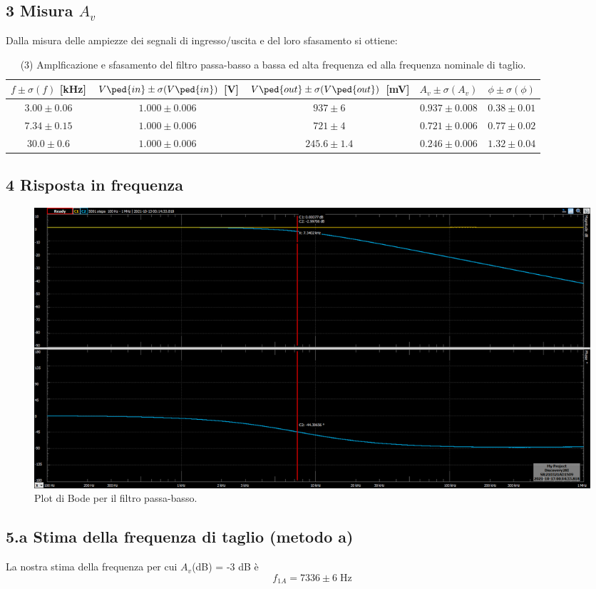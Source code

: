 \documentclass[10pt,a4paper]{article}
\begin{document}
\subsection*{3 Misura $A_v$}
Dalla misura delle ampiezze dei segnali di ingresso/uscita e del loro 
sfasamento si ottiene:
\begin{table}[h]
\centering
\begin{tabular}{|c|c|c|c|c|}
\hline 
$f \pm \sigma(f)$ [kHz] & $V\ped{in} \pm \sigma(V\ped{in})$ [V] 
                        & $V\ped{out} \pm \sigma(V\ped{out})$ [mV] & $A_v \pm 
\sigma(A_v)$
& $\phi \pm \sigma(\phi)$ \\
\hline 
$3.00 \pm 0.06$ & $1.000 \pm 0.006$ & $937 \pm 6$ & $0.937 \pm 0.008$ & $0.38 \pm 
0.01$ \\
$7.34 \pm 0.15$ & $1.000 \pm 0.006$ & $721 \pm 4$ & $0.721 \pm 0.006$ & $0.77 \pm 
0.02$ \\
$30.0 \pm 0.6$ & $1.000 \pm 0.006$ & $245.6 \pm 1.4$ & $0.246 \pm 0.006$ & $1.32 \pm 
0.04$ \\
\hline 
\end{tabular} 
\caption{(3) Amplficazione e sfasamento del filtro passa-basso a bassa ed alta 
frequenza ed alla frequenza nominale di taglio.
\label{tab: lpfmes}}
\end{table}

\subsection*{4 Risposta in frequenza}
\begin{figure}[htbp]
\centering
\includegraphics[scale=0.35]{rc2k10nF_new}
\caption{Plot di Bode per il filtro passa-basso.}
\end{figure}

\subsection*{5.a Stima della frequenza di taglio (metodo a)}
La nostra stima della frequenza per cui $A_v$(dB) = -3 dB \`e
\[
f_{1A} = 7336 \pm 6 \; \si{\Hz}
\]
\end{document}
